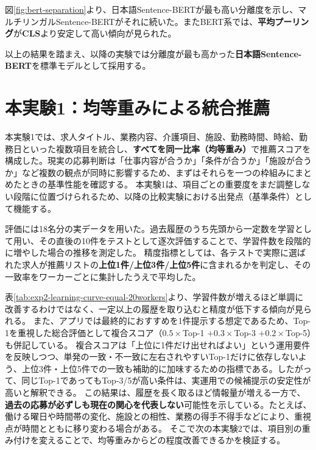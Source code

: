 図\ref{fig:bert-separation}より、日本語Sentence-BERTが最も高い分離度を示し、マルチリンガルSentence-BERTがそれに続いた。またBERT系では、\textbf{平均プーリング}が\textbf{CLS}より安定して高い傾向が見られた。

以上の結果を踏まえ、以降の実験では分離度が最も高かった\textbf{日本語Sentence-BERT}を標準モデルとして採用する。


\section{本実験1：均等重みによる統合推薦}
本実験1では、求人タイトル、業務内容、介護項目、施設、勤務時間、時給、勤務日といった複数項目を統合し、\textbf{すべてを同一比率（均等重み）}で推薦スコアを構成した。現実の応募判断は「仕事内容が合うか」「条件が合うか」「施設が合うか」など複数の観点が同時に影響するため、まずはそれらを一つの枠組みにまとめたときの基準性能を確認する。
本実験1は、項目ごとの重要度をまだ調整しない段階に位置づけられるため、以降の比較実験における出発点（基準条件）として機能する。

評価には18名分の実データを用いた。過去履歴のうち先頭から一定数を学習として用い、その直後の10件をテストとして逐次評価することで、学習件数を段階的に増やした場合の推移を測定した。
精度指標としては、各テストで実際に選ばれた求人が推薦リストの\textbf{上位1件/上位3件/上位5件}に含まれるかを判定し、その一致率をワーカーごとに集計したうえで平均した。

\begin{table}[htbp]
\centering
\caption{均等重みにおける学習データ数別の精度推移}
\label{tab:exp2-learning-curve-equal-20workers}
\scriptsize

\end{table}

表\ref{tab:exp2-learning-curve-equal-20workers}より、学習件数が増えるほど単調に改善するわけではなく、一定以上の履歴を取り込むと精度が低下する傾向が見られる。
また、アプリでは最終的におすすめを1件提示する想定であるため、Top-1を重視した総合評価として複合スコア（$0.5\times$Top-1 $+ 0.3\times$Top-3 $+ 0.2\times$Top-5）も併記している。
複合スコアは「上位に1件だけ出せればよい」という運用要件を反映しつつ、単発の一致・不一致に左右されやすいTop-1だけに依存しないよう、上位3件・上位5件での一致も補助的に加味するための指標である。したがって、同じTop-1であってもTop-3/5が高い条件は、実運用での候補提示の安定性が高いと解釈できる。
この結果は、履歴を長く取るほど情報量が増える一方で、\textbf{過去の応募が必ずしも現在の関心を代表しない}可能性を示している。たとえば、働ける曜日や時間帯の変化、施設との相性、業務の得手不得手などにより、重視点が時間とともに移り変わる場合がある。
そこで次の本実験2では、項目別の重み付けを変えることで、均等重みからどの程度改善できるかを検証する。


